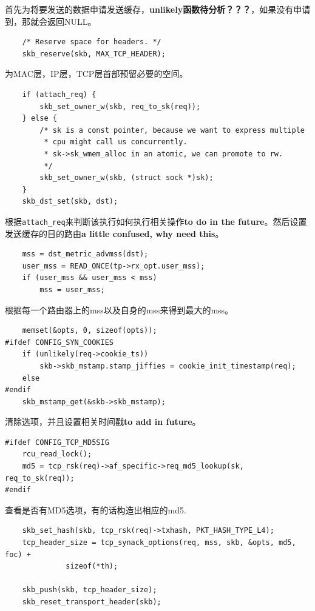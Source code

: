                 首先为将要发送的数据申请发送缓存，\textbf{unlikely函数待分析？？？}，如果没有申请到，那就会返回NULL。

\begin{verbatim}
    /* Reserve space for headers. */
    skb_reserve(skb, MAX_TCP_HEADER);
\end{verbatim}

                为MAC层，IP层，TCP层首部预留必要的空间。

\begin{verbatim}
    if (attach_req) {
        skb_set_owner_w(skb, req_to_sk(req));
    } else {
        /* sk is a const pointer, because we want to express multiple
         * cpu might call us concurrently.
         * sk->sk_wmem_alloc in an atomic, we can promote to rw.
         */
        skb_set_owner_w(skb, (struct sock *)sk);
    }
    skb_dst_set(skb, dst);
\end{verbatim}

                根据\texttt{attach_req}来判断该执行如何执行相关操作\textbf{to do in the future}。然后设置发送缓存的目的路由\textbf{a little confused, why need this}。

\begin{verbatim}
    mss = dst_metric_advmss(dst);
    user_mss = READ_ONCE(tp->rx_opt.user_mss);
    if (user_mss && user_mss < mss)
        mss = user_mss;
\end{verbatim}

                根据每一个路由器上的mss以及自身的mss来得到最大的mss。
\begin{verbatim}
    memset(&opts, 0, sizeof(opts));
#ifdef CONFIG_SYN_COOKIES
    if (unlikely(req->cookie_ts))
        skb->skb_mstamp.stamp_jiffies = cookie_init_timestamp(req);
    else
#endif
    skb_mstamp_get(&skb->skb_mstamp);
\end{verbatim}

                清除选项，并且设置相关时间戳\textbf{to add in future}。


\begin{verbatim}
#ifdef CONFIG_TCP_MD5SIG
    rcu_read_lock();
    md5 = tcp_rsk(req)->af_specific->req_md5_lookup(sk, req_to_sk(req));
#endif
\end{verbatim}

                查看是否有MD5选项，有的话构造出相应的md5.

\begin{verbatim}
    skb_set_hash(skb, tcp_rsk(req)->txhash, PKT_HASH_TYPE_L4);
    tcp_header_size = tcp_synack_options(req, mss, skb, &opts, md5, foc) +
              sizeof(*th);

    skb_push(skb, tcp_header_size);
    skb_reset_transport_header(skb);
\end{verbatim}

